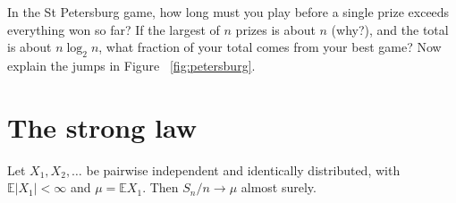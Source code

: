\begin{think}
In the St Petersburg game, how long must you play before a single prize exceeds everything won so far? If the largest of $n$ prizes is about $n$
(why?), and the total is about $n\log_2n$, what fraction of your total comes from your best game? Now explain the jumps in Figure~
\ref{fig:petersburg}.
\end{think}

\section{The strong law}

\begin{theorem}[Etemadi, 1981]\label{thm:etemadi}
Let $X_1,X_2,\dots$ be pairwise independent and identically distributed, with $\mathbb E|X_1|<\infty$ and $\mu=\mathbb E X_1$. Then
$S_n/n\to\mu$ almost surely.
\end{theorem}
